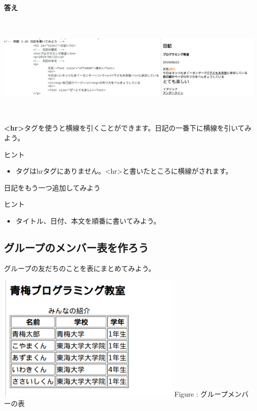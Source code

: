 \documentclass[a4paper,12pt]{jarticle}
\begin{document}
\clearpage
\textbf{答え}



\includegraphics[width=16.163cm,height=5.057cm]{textbook-img188.png}

\theQuestion\label{Q:hasAnswer04-8}
\textbf{{\textless}hr{\textgreater}}タグを使うと横線を引くことができます。日記の一番下に横線を引いてみよう。

ヒント

\begin{itemize}
  \item
        タグはhrタグにありません。{\textless}hr{\textgreater}と書いたところに横線がされます。
\end{itemize}
\theQuestion\label{Q:hasAnswer04-9}

日記をもう一つ追加してみよう

ヒント

\begin{itemize}
  \item
        タイトル、日付、本文を順番に書いてみよう。
\end{itemize}
\clearpage
{}
\subsection{\theExercise グループのメンバー表を作ろう}
グループの友だちのことを表にまとめてみよう。

\centering
\begin{minipage}{8.998cm}
  {\upshape
    \includegraphics[width=8.998cm,height=6.234cm]{textbook-img189.png}
    \newline
    Figure : グループメンバーの表}
\end{minipage}
\end{document}
